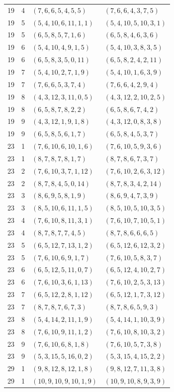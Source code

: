 \begin{longtable}{rrll}
19&4&$(7,6,6,5,4,5,5)$&$(7,6,6,4,3,7,5)$\\
19&5&$(5,4,10,6,11,1,1)$&$(5,4,10,5,10,3,1)$\\
19&5&$(6,5,8,5,7,1,6)$&$(6,5,8,4,6,3,6)$\\
19&6&$(5,4,10,4,9,1,5)$&$(5,4,10,3,8,3,5)$\\
19&6&$(6,5,8,3,5,0,11)$&$(6,5,8,2,4,2,11)$\\
19&7&$(5,4,10,2,7,1,9)$&$(5,4,10,1,6,3,9)$\\
19&7&$(7,6,6,5,3,7,4)$&$(7,6,6,4,2,9,4)$\\
19&8&$(4,3,12,3,11,0,5)$&$(4,3,12,2,10,2,5)$\\
19&8&$(6,5,8,7,8,2,2)$&$(6,5,8,6,7,4,2)$\\
19&9&$(4,3,12,1,9,1,8)$&$(4,3,12,0,8,3,8)$\\
19&9&$(6,5,8,5,6,1,7)$&$(6,5,8,4,5,3,7)$\\
23&1&$(7,6,10,6,10,1,6)$&$(7,6,10,5,9,3,6)$\\
23&1&$(8,7,8,7,8,1,7)$&$(8,7,8,6,7,3,7)$\\
23&2&$(7,6,10,3,7,1,12)$&$(7,6,10,2,6,3,12)$\\
23&2&$(8,7,8,4,5,0,14)$&$(8,7,8,3,4,2,14)$\\
23&3&$(8,6,9,5,8,1,9)$&$(8,6,9,4,7,3,9)$\\
23&3&$(8,5,10,6,11,1,5)$&$(8,5,10,5,10,3,5)$\\
23&4&$(7,6,10,8,11,3,1)$&$(7,6,10,7,10,5,1)$\\
23&4&$(8,7,8,7,7,4,5)$&$(8,7,8,6,6,6,5)$\\
23&5&$(6,5,12,7,13,1,2)$&$(6,5,12,6,12,3,2)$\\
23&5&$(7,6,10,6,9,1,7)$&$(7,6,10,5,8,3,7)$\\
23&6&$(6,5,12,5,11,0,7)$&$(6,5,12,4,10,2,7)$\\
23&6&$(7,6,10,3,6,1,13)$&$(7,6,10,2,5,3,13)$\\
23&7&$(6,5,12,2,8,1,12)$&$(6,5,12,1,7,3,12)$\\
23&7&$(8,7,8,7,6,7,3)$&$(8,7,8,6,5,9,3)$\\
23&8&$(5,4,14,2,11,1,9)$&$(5,4,14,1,10,3,9)$\\
23&8&$(7,6,10,9,11,1,2)$&$(7,6,10,8,10,3,2)$\\
23&9&$(7,6,10,6,8,1,8)$&$(7,6,10,5,7,3,8)$\\
23&9&$(5,3,15,5,16,0,2)$&$(5,3,15,4,15,2,2)$\\
29&1&$(9,8,12,8,12,1,8)$&$(9,8,12,7,11,3,8)$\\
29&1&$(10,9,10,9,10,1,9)$&$(10,9,10,8,9,3,9)$\\

\end{longtable}

